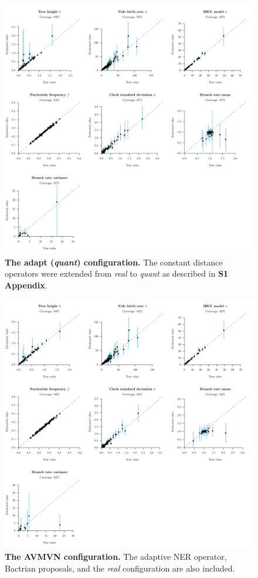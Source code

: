 \documentclass[12pt]{article}
\begin{document}
\begin{figure}[!htb]
\includegraphics[width=\textwidth]{RatesWCSS/WCSS_quant_cached_adaptive.pdf}
\caption{\textbf{The adapt (\textit{quant}) configuration.} The constant distance operators were extended from \emph{real} to \emph{quant} as described in \textbf{S1 Appendix}.}
\end{figure}




\begin{figure}[!htb]
\includegraphics[width=\textwidth]{RatesWCSS/WCSS_AVMVN.pdf}
\caption{\textbf{The AVMVN configuration.} The adaptive NER operator, Bactrian proposals, and the \emph{real} configuration are also included.}
\end{figure}





%
\end{document}
